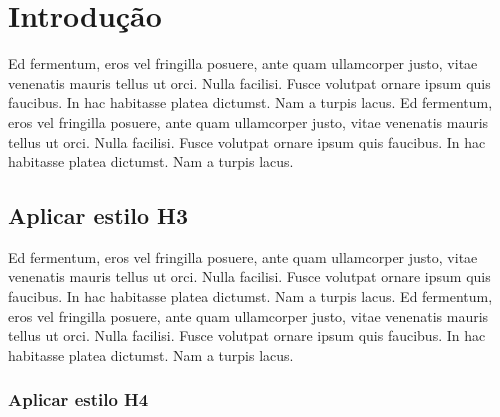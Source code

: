 \documentclass[10.5pt,17.35pt,a4paper]{article}
\begin{document}
\coveramz

\newpage

\secondpageamz

\newpage

{
\thispagestyle{empty}
\hypersetup{linkcolor = cinza_amz2030}
\tableofcontents
}

\newpage

{
\thispagestyle{empty}
\hypersetup{linkcolor = cinza_amz2030}
\listoffigures
}

\newpage

{
\thispagestyle{empty}
\hypersetup{linkcolor = cinza_amz2030}
\listoftables
}

\newpage


\setcounter{page}{1}

\section{Introdução} \label{sec:introduction}

Ed fermentum, eros vel fringilla posuere, ante quam ullamcorper justo, vitae venenatis mauris tellus ut orci. Nulla facilisi. Fusce volutpat ornare ipsum quis faucibus. In hac habitasse platea dictumst. Nam a turpis lacus. Ed fermentum, eros vel fringilla posuere, ante quam ullamcorper justo, vitae venenatis mauris tellus ut orci. Nulla facilisi. Fusce volutpat ornare ipsum quis faucibus. In hac habitasse platea dictumst. Nam a turpis lacus. 

\subsection{Aplicar estilo H3}

Ed fermentum, \citep{Faria1989, Wong2005, Goncalves2019} eros vel fringilla posuere, ante quam ullamcorper justo, vitae venenatis mauris tellus ut orci. Nulla facilisi. Fusce volutpat ornare ipsum quis faucibus. In hac habitasse platea dictumst. Nam a turpis lacus. Ed fermentum, eros vel fringilla posuere, ante quam ullamcorper justo, vitae venenatis mauris tellus ut orci. Nulla facilisi. Fusce volutpat ornare ipsum quis faucibus. In hac habitasse platea dictumst. Nam a turpis lacus.

\subsubsection{Aplicar estilo H4}
 
\end{document}
